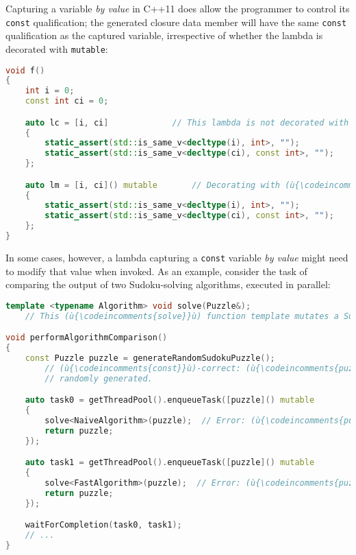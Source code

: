 Capturing a variable \textit{by value} in C++11 does allow the
programmer to control its \texttt{const} qualification; the generated
closure data member will have the same \texttt{const} qualification as
the captured variable, irrespective of whether the lambda is decorated
with \texttt{mutable}:

\begin{lstlisting}[language=C++]
void f()
{
    int i = 0;
    const int ci = 0;

    auto lc = [i, ci]             // This lambda is not decorated with (ù{\codeincomments{mutable}}ù).
    {
        static_assert(std::is_same_v<decltype(i), int>, "");
        static_assert(std::is_same_v<decltype(ci), const int>, "");
    };

    auto lm = [i, ci]() mutable       // Decorating with (ù{\codeincomments{mutable}}ù) has no effect.
    {
        static_assert(std::is_same_v<decltype(i), int>, "");
        static_assert(std::is_same_v<decltype(ci), const int>, "");
    };
}
\end{lstlisting}

\noindent In some cases, however, a lambda capturing a \texttt{const} variable
\emph{by value} might need to modify that value when invoked. As an
example, consider the task of comparing the output of two Sudoku-solving
algorithms, executed in parallel:

\begin{lstlisting}[language=C++]
template <typename Algorithm> void solve(Puzzle&);
    // This (ù{\codeincomments{solve}}ù) function template mutates a Sudoku grid in place to solution.

void performAlgorithmComparison()
{
    const Puzzle puzzle = generateRandomSudokuPuzzle();
        // (ù{\codeincomments{const}}ù)-correct: (ù{\codeincomments{puzzle}}ù) is not going to be mutated after being
        // randomly generated.

    auto task0 = getThreadPool().enqueueTask([puzzle]() mutable
    {
        solve<NaiveAlgorithm>(puzzle);  // Error: (ù{\codeincomments{puzzle}}ù) is (ù{\codeincomments{const}}ù)-qualified.
        return puzzle;
    });

    auto task1 = getThreadPool().enqueueTask([puzzle]() mutable
    {
        solve<FastAlgorithm>(puzzle);  // Error: (ù{\codeincomments{puzzle}}ù) is (ù{\codeincomments{const}}ù)-qualified.
        return puzzle;
    });

    waitForCompletion(task0, task1);
    // ...
}
\end{lstlisting}

